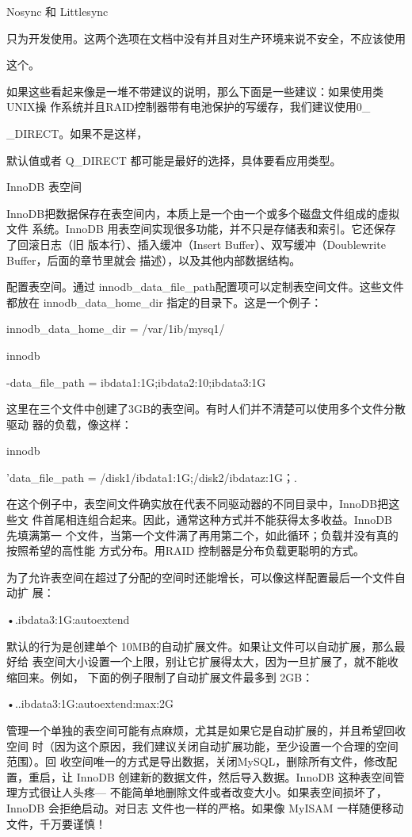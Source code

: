 Nosync 和 Littlesync

只为开发使用。这两个选项在文档中没有并且对生产环境来说不安全，不应该使用

这个。

如果这些看起来像是一堆不带建议的说明，那么下面是一些建议：如果使用类UNIX操
作系统并且RAID控制器带有电池保护的写缓存，我们建议使用0\_

\_DIRECT。如果不是这样，

默认值或者 Q\_DIRECT 都可能是最好的选择，具体要看应用类型。

InnoDB 表空间

InnoDB把数据保存在表空间内，本质上是一个由一个或多个磁盘文件组成的虚拟文件
系统。InnoDB 用表空间实现很多功能，并不只是存储表和索引。它还保存了回滚日志（旧
版本行）、插入缓冲（Insert Buffer）、双写缓冲（Doublewrite Buffer，后面的章节里就会
描述），以及其他内部数据结构。

配置表空间。通过 innodb\_data\_file\_path配置项可以定制表空间文件。这些文件都放在
innodb\_data\_home\_dir 指定的目录下。这是一个例子：

innodb\_data\_home\_dir = /var/1ib/mysq1/

innodb

-data\_file\_path = ibdata1:1G;ibdata2:10;ibdata3:1G

这里在三个文件中创建了3GB的表空间。有时人们并不清楚可以使用多个文件分散驱动
器的负载，像这样：

innodb

'data\_file\_path = /disk1/ibdata1:1G;/disk2/ibdataz:1G；.

在这个例子中，表空间文件确实放在代表不同驱动器的不同目录中，InnoDB把这些文
件首尾相连组合起来。因此，通常这种方式并不能获得太多收益。InnoDB 先填满第一
个文件，当第一个文件满了再用第二个，如此循环；负载并没有真的按照希望的高性能
方式分布。用RAID 控制器是分布负载更聪明的方式。

为了允许表空间在超过了分配的空间时还能增长，可以像这样配置最后一个文件自动扩
展：

•.ibdata3:1G:autoextend

默认的行为是创建单个 10MB的自动扩展文件。如果让文件可以自动扩展，那么最好给
表空间大小设置一个上限，别让它扩展得太大，因为一旦扩展了，就不能收缩回来。例如，
下面的例子限制了自动扩展文件最多到 2GB：

•..ibdata3:1G:autoextend:max:2G

管理一个单独的表空间可能有点麻烦，尤其是如果它是自动扩展的，并且希望回收空间
时（因为这个原因，我们建议关闭自动扩展功能，至少设置一个合理的空间范围）。回
收空间唯一的方式是导出数据，关闭MySQL，删除所有文件，修改配置，重启，让
InnoDB 创建新的数据文件，然后导入数据。InnoDB 这种表空间管理方式很让人头疼—
不能简单地删除文件或者改变大小。如果表空间损坏了，InnoDB 会拒绝启动。对日志
文件也一样的严格。如果像 MyISAM 一样随便移动文件，千万要谨慎！

